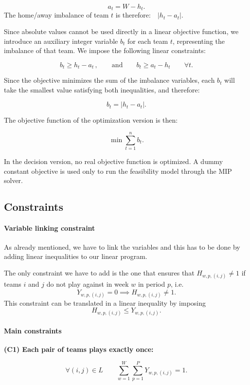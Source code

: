 \[
a_t = W - h_t.
\]
The home/away imbalance of team $t$ is therefore:$\quad|h_t - a_t|.$

Since absolute values cannot be used directly in a linear objective function, we
introduce an auxiliary integer variable $b_t$ for each team $t$, representing
the imbalance of that team. We impose the following linear constraints:

\[
b_t \geq h_t - a_t \,,
\qquad\text{and} \qquad
b_t \geq a_t - h_t \qquad \forall t.
\]

Since the objective minimizes the sum of the imbalance variables, each $b_t$
will take the smallest value satisfying both inequalities, and therefore:

\[
b_t = |h_t - a_t|.
\]

The objective function of the optimization version is then:

\[
\min \sum_{t=1}^{n} b_t.
\]

In the decision version, no real objective function is optimized. A dummy
constant objective is used only to run the feasibility model through the MIP
solver.



\subsection{Constraints}

\paragraph{Variable linking constraint}
As already mentioned, we have to link the variables and this has to be done by adding linear inequalities to our linear program.

The only constraint we have to add is the one that ensures that $H_{w,p,(i,j)}\neq1$ if teams $i$ and $j$ do not play against in week $w$ in period $p$, i.e.
\[
Y_{w,p,(i,j)} = 0\implies H_{w,p,(i,j)}\neq1.
\]
This constraint can be translated in a linear inequality by imposing
\[
H_{w,p,(i,j)} \leq Y_{w,p,(i,j)}.
\]

\paragraph{Main constraints}
\textbf{(C1) Each pair of teams plays exactly once:}

\[
\forall (i,j) \in L \qquad
\sum_{w=1}^{W} \sum_{p=1}^{P} Y_{w,p,(i,j)} = 1.
\]

